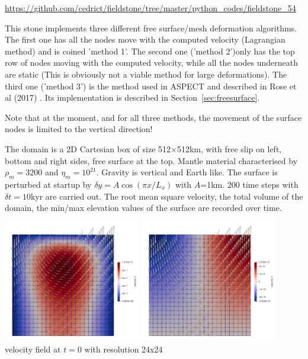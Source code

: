 \url{https://github.com/cedrict/fieldstone/tree/master/python_codes/fieldstone_54}

\vspace{1cm}

This stone implements three different free surface/mesh deformation algorithms. 
The first one has all the nodes move with the computed velocity (Lagrangian method)
and is coined 'method 1'. 
The second one ('method 2')only has the top row of nodes moving with the computed velocity, 
while all the nodes underneath are static (This is obviously not a viable method for 
large deformations). 
The third one ('method 3') is the method used in ASPECT and described in Rose et al (2017) \cite{robh17}.
Its implementation is described in Section~\ref{sec:freesurface}.

Note that at the moment, and for all three methods, the movement of the surface nodes is limited 
to the vertical direction!

The domain is a 2D Cartesian box of size 512$\times$512km, with free slip on left, 
bottom and right sides, free surface at the top. 
Mantle material characterised by $\rho_m=3200$ and $\eta_m=10^{21}$. 
Gravity is vertical and Earth like. 
The surface is perturbed at startup by $\delta y = A \cos (\pi x /L_x)$ with $A$=1km.
200 time steps with $\delta t=10$kyr are carried out.
The root mean square velocity, the total volume of the domain, the min/max elevation
values of the surface are recorded over time. 

\begin{center}
\includegraphics[width=6cm]{python_codes/fieldstone_54/images/u}
\includegraphics[width=6cm]{python_codes/fieldstone_54/images/v}\\
{\scriptsize velocity field at $t=0$ with resolution 24x24}
\end{center}

